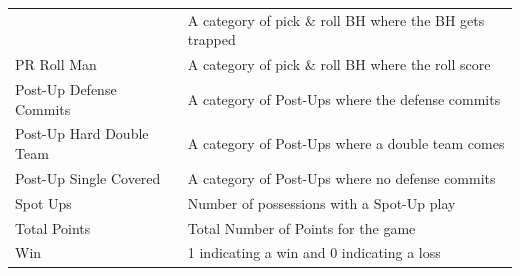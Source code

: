 \documentclass[]{book}
\begin{document}
\begin{longtable}[]{@{}ll@{}}
\begin{minipage}[t]{0.29\columnwidth}
\end{minipage} & \begin{minipage}[t]{0.65\columnwidth}\raggedright
A category of pick \& roll BH where the BH gets trapped\strut
\end{minipage}\tabularnewline
\begin{minipage}[t]{0.29\columnwidth}\raggedright
PR Roll Man\strut
\end{minipage} & \begin{minipage}[t]{0.65\columnwidth}\raggedright
A category of pick \& roll BH where the roll score\strut
\end{minipage}\tabularnewline
\begin{minipage}[t]{0.29\columnwidth}\raggedright
Post-Up Defense Commits\strut
\end{minipage} & \begin{minipage}[t]{0.65\columnwidth}\raggedright
A category of Post-Ups where the defense commits\strut
\end{minipage}\tabularnewline
\begin{minipage}[t]{0.29\columnwidth}\raggedright
Post-Up Hard Double Team\strut
\end{minipage} & \begin{minipage}[t]{0.65\columnwidth}\raggedright
A category of Post-Ups where a double team comes\strut
\end{minipage}\tabularnewline
\begin{minipage}[t]{0.29\columnwidth}\raggedright
Post-Up Single Covered\strut
\end{minipage} & \begin{minipage}[t]{0.65\columnwidth}\raggedright
A category of Post-Ups where no defense commits\strut
\end{minipage}\tabularnewline
\begin{minipage}[t]{0.29\columnwidth}\raggedright
Spot Ups\strut
\end{minipage} & \begin{minipage}[t]{0.65\columnwidth}\raggedright
Number of possessions with a Spot-Up play\strut
\end{minipage}\tabularnewline
\begin{minipage}[t]{0.29\columnwidth}\raggedright
Total Points\strut
\end{minipage} & \begin{minipage}[t]{0.65\columnwidth}\raggedright
Total Number of Points for the game\strut
\end{minipage}\tabularnewline
\begin{minipage}[t]{0.29\columnwidth}\raggedright
Win\strut
\end{minipage} & \begin{minipage}[t]{0.65\columnwidth}\raggedright
1 indicating a win and 0 indicating a loss\strut
\end{minipage}\tabularnewline
\bottomrule
\end{longtable}
\end{document}
